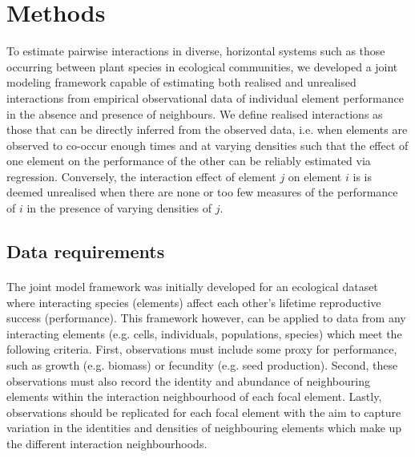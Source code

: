 \documentclass[a4,12pt]{article}
\begin{document}

\section{Methods}


To estimate pairwise interactions in diverse, horizontal systems such as those occurring between plant species in ecological communities, we developed a joint modeling framework capable of estimating both realised and unrealised interactions from empirical observational data of individual element performance in the absence and presence of neighbours. We define realised interactions as those that can be directly inferred from the observed data, i.e. when elements are observed to co-occur enough times and at varying densities such that the effect of one element on the performance of the other can be reliably estimated via regression. Conversely, the interaction effect of element $j$ on element $i$ is is deemed unrealised when there are none or too few measures of the performance of $i$ in the presence of varying densities of $j$. 

    
    \subsection{Data requirements}

    \paragraph{}
    The joint model framework was initially developed for an ecological dataset where interacting species (elements) affect each other's lifetime reproductive success (performance). This framework however, can be applied to data from any interacting elements (e.g. cells, individuals, populations, species) which meet the following criteria. First, observations must include some proxy for performance, such as growth (e.g. biomass) or fecundity (e.g. seed production).  Second, these observations must also record the identity and abundance of neighbouring elements within the interaction neighbourhood of each focal element. Lastly, observations should be replicated for each focal element with the aim to capture variation in the identities and densities of neighbouring elements which make up the different interaction neighbourhoods. 

 
\end{document}
